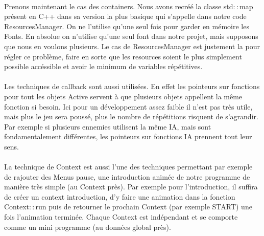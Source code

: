 \paragraph{} Prenons maintenant le cas des containers. Nous avons recréé la classe std$::$map présent en C++ dans sa version la plus basique qui s'appelle dans notre code ResourcesManager. On ne l'utilise qu'une seul fois pour garder en mémoire les Fonts. En absolue on n'utilise qu'une seul font dans notre projet, mais supposons que nous en voulons plusieurs. Le cas de ResourcesManager est justement la pour régler ce problème, faire en sorte que les resources soient le plus simplement possible accéssible et avoir le minimum de variables répétitives.
\paragraph{} Les techniques de callback sont aussi utilisées. En effet les pointeurs sur fonctions pour tout les objets Active servent à que plusieurs objets appellent la même fonction si besoin. Ici pour un développement assez faible il n'est pas très utile, mais plus le jeu sera poussé, plus le nombre de répétitions risquent de s'agrandir. Par exemple si plusieurs ennemies utilisent la même IA, mais sont fondamentalement différentes, les pointeurs sur fonctions IA prennent tout leur sens.
\paragraph{} La technique de Context est aussi l'une des techniques permettant par exemple de rajouter des Menus pause, une introduction animée de notre programme de manière très simple (au Context près). Par exemple pour l'introduction, il suffira de créer un context introduction, d'y faire une animation dans la fonction Context$::$run puis de retourner le prochain Context (par exemple START) une fois l'animation terminée. Chaque Context est indépendant et se comporte comme un mini programme (au données global près).
